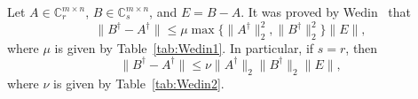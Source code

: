 \documentclass[11pt]{article}
\begin{document}
Let $A\in\mathbb{C}^{m\times n}_{r}$, $B\in\mathbb{C}^{m\times n}_{s}$, and $E=B-A$. It was proved by Wedin~\cite{Wedin1973} that
\begin{equation}\label{Wedin1}
\|B^{\dagger}-A^{\dagger}\|\leq\mu\max\big\{\|A^{\dagger}\|_{2}^{2},\|B^{\dagger}\|_{2}^{2}\big\}\|E\|,
\end{equation}
where $\mu$ is given by Table~\ref{tab:Wedin1}. In particular, if $s=r$, then
\begin{equation}\label{Wedin2}
\|B^{\dagger}-A^{\dagger}\|\leq\nu\|A^{\dagger}\|_{2}\|B^{\dagger}\|_{2}\|E\|,
\end{equation}
where $\nu$ is given by Table~\ref{tab:Wedin2}.

\begin{table}[h!!]
\centering
{}
\caption{\small The values of $\mu$ in~\eqref{Wedin1}.}
\label{tab:Wedin1}
\end{table} 

\begin{table}[h!!]
\centering
{}
\caption{\small The values of $\nu$ in~\eqref{Wedin2}.}
\label{tab:Wedin2}
\end{table}
\end{document}
